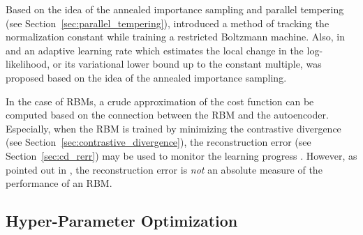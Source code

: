\documentclass[dissertation,nocontribution,draft*]{aaltoseries}
\begin{document}
Based on the idea of the annealed importance sampling and
parallel tempering (see
Section~\ref{sec:parallel_tempering}),
\citet{Desjardins2011} introduced a method of tracking the
normalization constant while training a restricted Boltzmann
machine. Also, in  and
 an adaptive learning rate which
estimates the local change in the log-likelihood, or its
variational lower bound up to the constant multiple, was
proposed based on the idea of the annealed importance
sampling.

In the case of RBMs, a crude approximation of the cost
function can be computed based on the connection between the
RBM and the autoencoder. Especially, when the RBM is trained
by minimizing the contrastive divergence (see
Section~\ref{sec:contrastive_divergence}), the
reconstruction error (see Section~\ref{sec:cd_rerr}) may be
used to monitor the learning progress \citep{Hinton2012rbm}.
However, as pointed out in \citep{Hinton2012rbm}, the
reconstruction error is \textit{not} an absolute measure of
the performance of an RBM.

\subsection{Hyper-Parameter Optimization}
\label{sec:hyperopt}
\end{document}
